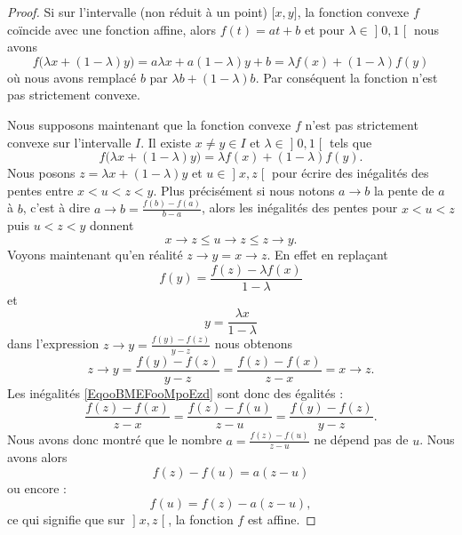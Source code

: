 \begin{proof}
    Si sur l'intervalle (non réduit à un point) \( \mathopen[ x , y \mathclose]\), la fonction convexe \( f\) coïncide avec une fonction affine, alors \( f(t)=at+b\) et pour \( \lambda\in\mathopen] 0 , 1 \mathclose[\) nous avons
        \begin{equation}
                f\big( \lambda x+(1-\lambda)y \big)=a\lambda x+a(1-\lambda)y+b=\lambda f(x)+(1-\lambda)f(y)
        \end{equation}
        où nous avons remplacé \( b\) par \( \lambda b+(1-\lambda)b\). Par conséquent la fonction n'est pas strictement convexe.

    Nous supposons maintenant que la fonction convexe \( f\) n'est pas strictement convexe sur l'intervalle \( I\). Il existe \( x\neq y\in I\) et \( \lambda\in \mathopen] 0 , 1 \mathclose[\) tels que
        \begin{equation}
            f\big( \lambda x+(1-\lambda)y \big)=\lambda f(x)+(1-\lambda)f(y).
        \end{equation}
    Nous posons \( z=\lambda x+(1-\lambda)y\) et \( u\in\mathopen] x , z \mathclose[\) pour écrire des inégalités des pentes entre \( x<u<z<y\). Plus précisément si nous notons \( a\to b\) la pente de \( a\) à \( b\), c'est à dire \( a\to b=\frac{ f(b)-f(a) }{ b-a }\), alors les inégalités des pentes pour \( x<u<z\) puis \( u<z<y\) donnent
        \begin{equation}        \label{EqooBMEFooMpoEzd}
            x\to z\leq u\to z\leq z\to y.
        \end{equation}
        Voyons maintenant qu'en réalité \( z\to y=x\to z\). En effet en replaçant
        \begin{equation}
            f(y)=\frac{ f(z)-\lambda f(x) }{ 1-\lambda }
        \end{equation}
        et
        \begin{equation}
            y=\frac{ \lambda x }{ 1-\lambda }
        \end{equation}
        dans l'expression \( z\to y=\frac{ f(y)-f(z) }{ y-z }\) nous obtenons
        \begin{equation}
            z\to y=\frac{ f(y)-f(z) }{ y-z }=\frac{ f(z)-f(x) }{ z-x }=x\to z.
        \end{equation}
        Les inégalités \eqref{EqooBMEFooMpoEzd} sont donc des égalités :
        \begin{equation}
            \frac{ f(z)-f(x) }{ z-x }=\frac{ f(z)-f(u) }{ z-u }=\frac{ f(y)-f(z) }{ y-z }.
        \end{equation}
        Nous avons donc montré que le nombre \( a=\frac{ f(z)-f(u) }{ z-u }\) ne dépend pas de \( u\). Nous avons alors
        \begin{equation}
            f(z)-f(u)=a(z-u)
        \end{equation}
        ou encore :
        \begin{equation}
            f(u)=f(z)-a(z-u),
        \end{equation}
    ce qui signifie que sur \( \mathopen] x , z \mathclose[\), la fonction \( f\) est affine.
\end{proof}

